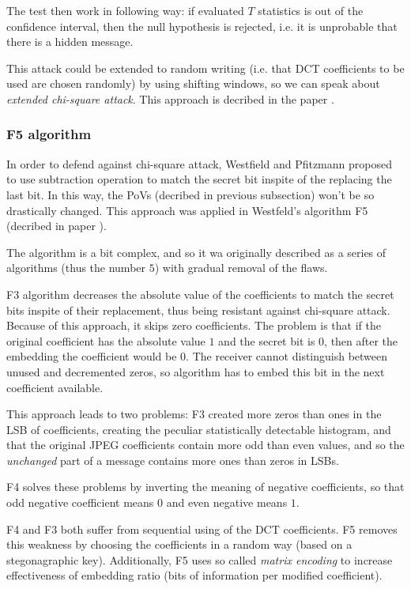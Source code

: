The test then work in following way: if evaluated $T$ statistics is 
out of the confidence interval, then the null hypothesis is rejected, i.e. it is unprobable that there is a hidden message. 

This attack could be extended to random writing (i.e. that DCT coefficients to be used
are chosen randomly) by using shifting windows, so we can speak about \textit{extended chi-square attack}. 
This approach is decribed in the paper \cite{provos2001detecting}.

\subsubsection{F5 algorithm}

In order to defend against chi-square attack, Westfield and Pfitzmann proposed to use 
subtraction operation to match the secret bit inspite of the replacing the last bit. In this way,
the PoVs (decribed in previous subsection) won't be so drastically changed. This approach was applied
in Westfeld's algorithm F5 (decribed in paper \cite{steganalysis2001f5}).

The algorithm is a bit complex, and so it wa originally described as a series of algorithms (thus the number $5$)
with gradual removal of the flaws.

F3 algorithm decreases the absolute value of the coefficients to match the secret bits inspite of their replacement, 
thus being resistant against chi-square attack. Because of this approach, it skips zero coefficients. The problem is
that if the original coefficient has the absolute value $1$ and the secret bit is $0$, then after the embedding
the coefficient would be $0$. The receiver cannot distinguish between unused and decremented zeros, so algorithm
has to embed this bit in the next coefficient available.

This approach leads to two problems: F3 created more zeros than ones in the LSB of coefficients, creating the peculiar
statistically detectable histogram, and that the original JPEG coefficients contain more odd than even values, and so
the \emph{unchanged} part of a message contains more ones than zeros in LSBs.

F4 solves these problems by inverting the meaning of negative coefficients, so that odd negative coefficient means $0$
and even negative means $1$.

F4 and F3 both suffer from sequential using of the DCT coefficients. F5 removes this weakness by choosing the coefficients
in a random way (based on a stegonagraphic key). Additionally, F5 uses so called \emph{matrix encoding} to increase effectiveness
of embedding ratio (bits of information per modified coefficient).

